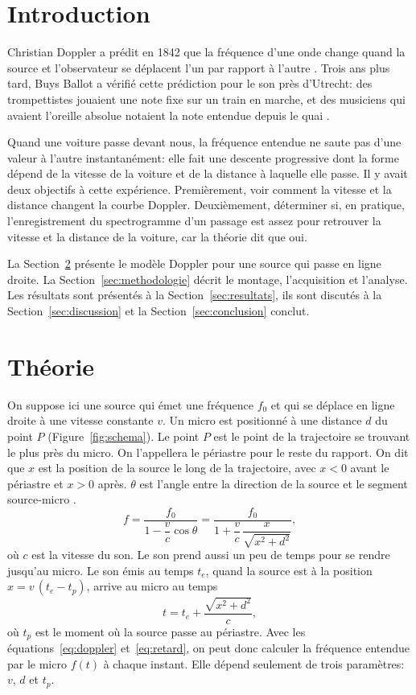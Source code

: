\documentclass[11pt,letterpaper]{article}
\newcommand{\beq}[1]{\begin{equation} \label{#1}}
\def\enq{\end{equation}}
\begin{document}
\section{Introduction}

Christian Doppler a prédit en 1842 que la fréquence d'une onde change quand la source et l'observateur se déplacent l'un par rapport à l'autre \cite{doppler}. Trois ans plus tard, Buys Ballot a vérifié cette prédiction pour le son près d'Utrecht: des trompettistes jouaient une note fixe sur un train en marche, et des musiciens qui avaient l'oreille absolue notaient la note entendue depuis le quai \cite{buysballot}.

Quand une voiture passe devant nous, la fréquence entendue ne saute pas d'une valeur à l'autre instantanément: elle fait une descente progressive dont la forme dépend de la vitesse de la voiture et de la distance à laquelle elle passe. Il y avait deux objectifs à cette expérience. Premièrement, voir comment la vitesse et la distance changent la courbe Doppler. Deuxièmement, déterminer si, en pratique, l'enregistrement du spectrogramme d'un passage est assez pour retrouver la vitesse et la distance de la voiture, car la théorie dit que oui.

La Section~\ref{sec:theorie} présente le modèle Doppler pour une source qui passe en ligne droite. La Section~\ref{sec:methodologie} décrit le montage, l'acquisition et l'analyse. Les résultats sont présentés à la Section~\ref{sec:resultats}, ils sont discutés à la Section~\ref{sec:discussion} et la Section~\ref{sec:conclusion} conclut.

\section{Théorie}
\label{sec:theorie}

On suppose ici une source qui émet une fréquence $f_0$ et qui se déplace en ligne droite à une vitesse constante $v$. Un micro est positionné à une distance $d$ du point $P$ (Figure~\ref{fig:schema}). Le point $P$ est le point de la trajectoire se trouvant le plus près du micro. On l'appellera le périastre pour le reste du rapport. On dit que $x$ est la position de la source le long de la trajectoire, avec $x < 0$ avant le périastre et $x > 0$ après. $\theta$ est l'angle entre la direction de la source et le segment source-micro \cite{morse}.
\beq{eq:doppler}
    f = \frac{f_0}{1 - \dfrac{v}{c}\cos\theta} = \frac{f_0}{1 + \dfrac{v}{c}\,\dfrac{x}{\sqrt{x^2 + d^2}}} ,
\enq
où $c$ est la vitesse du son. Le son prend aussi un peu de temps pour se rendre jusqu'au micro. Le son émis au temps $t_e$, quand la source est à la position $x = v\,(t_e - t_p)$, arrive au micro au temps
\beq{eq:retard}
    t = t_e + \frac{\sqrt{x^2 + d^2}}{c} ,
\enq
où $t_p$ est le moment où la source passe au périastre. Avec les équations~\ref{eq:doppler} et~\ref{eq:retard}, on peut donc calculer la fréquence entendue par le micro $f(t)$ à chaque instant. Elle dépend seulement de trois paramètres: $v$, $d$ et $t_p$.
\end{document}
